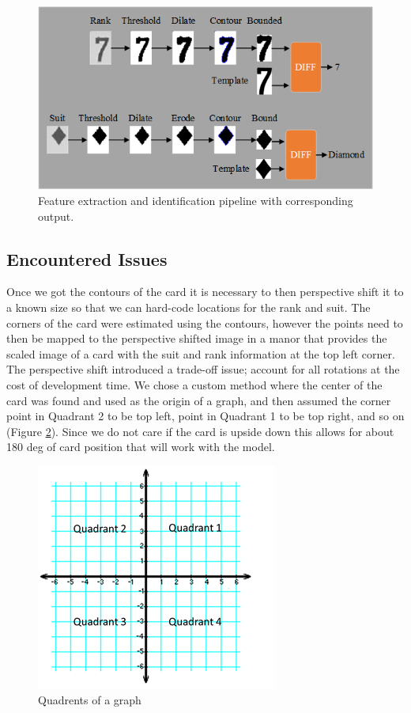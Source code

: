 \documentclass[conference]{IEEEtran}
\begin{document}
\begin{figure}[htbp]
\centerline{\includegraphics[width=\columnwidth]{PipelineExecFlowchart.png}}
\caption{Feature extraction and identification pipeline with corresponding output.}
\label{fig:feature-extraction-pipeline}
\end{figure}

\subsection{Encountered Issues}
Once we got the contours of the card it is necessary to then perspective shift it to a known size so
that we can hard-code locations for the rank and suit. The corners of the card were estimated using
the contours, however the points need to then be mapped to the perspective shifted image in a manor
that provides the scaled image of a card with the suit and rank information at the top left corner.
The perspective shift introduced a trade-off issue; account for all rotations at the cost of
development time. We chose a custom method where the center of the card was found and used as the
origin of a graph, and then assumed the corner point in Quadrant 2 to be top left, point in Quadrant
1 to be top right, and so on (Figure \ref{fig:graph}). Since we do not care if the card is upside
down this allows for about 180 deg of card position that will work with the model.

\begin{figure}[htbp]
\centerline{\includegraphics{graph-quadrants.png}}
\caption{Quadrents of a graph}
\label{fig:graph}
\end{figure}
\end{document}
